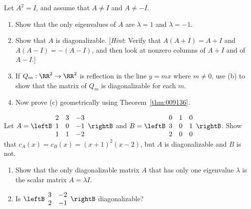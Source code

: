 \begin{multicols}{2}
\begin{ex}
\begin{sol}
\begin{enumerate}[label={\alph*.}]
\end{enumerate}
\end{sol}
\end{ex}


\begin{ex}
Let $A^{2} = I$, and assume that $A \neq I$ and $A \neq -I$.


\begin{enumerate}[label={\alph*.}]
\item Show that the only eigenvalues of $A$ are $\lambda = 1$ and $\lambda = -1$.

\item Show that $A$ is diagonalizable. [\textit{Hint}: Verify that $A(A + I) = A + I$ and $A(A - I) = -(A - I)$, and then look at nonzero columns of $A + I$ and of $A - I$.]

\item If $Q_{m} : \RR^2 \to \RR^2$  is reflection in the line $y = mx$ where $m \neq 0$, use (b) to show that the matrix of $Q_{m}$ is diagonalizable for each $m$.

\item Now prove (c) geometrically using Theorem~\ref{thm:009136}.

\end{enumerate}
\end{ex}

\begin{ex}
Let $A = \leftB \begin{array}{rrr}
2 & 3 & -3 \\
1 & 0 & -1 \\
1 & 1 & -2 
\end{array} \rightB$
 and $B = \leftB \begin{array}{rrr}
0 & 1 & 0 \\
3 & 0 & 1 \\
2 & 0 & 0  
\end{array} \rightB$.
 Show that $c_{A}(x) = c_{B}(x) = (x + 1)^{2} (x - 2)$, but $A$ is diagonalizable and $B$ is not.
\end{ex}

\begin{ex}
\begin{enumerate}[label={\alph*.}]
\item Show that the only diagonalizable matrix $A$ that has only one eigenvalue $\lambda$ is the scalar matrix $A = \lambda I$.

\item Is $\leftB \begin{array}{rr}
3 & -2 \\
2 & -1 
\end{array}\rightB$
 diagonalizable?


\end{enumerate}
\end{ex}
\end{multicols}
